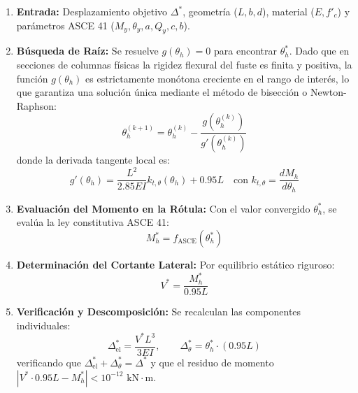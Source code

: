 \documentclass[11pt,letterpaper]{article}
\begin{document}
\begin{stepbox}
\begin{enumerate}
    \item \textbf{Entrada:} Desplazamiento objetivo $\Delta^*$, geometría ($L, b, d$), material ($E, f'_c$) y parámetros ASCE 41 ($M_y, \theta_y, a, Q_y, c, b$).
    \item \textbf{Búsqueda de Raíz:} Se resuelve $g(\theta_h) = 0$ para encontrar $\theta_h^*$. Dado que en secciones de columnas físicas la rigidez flexural del fuste es finita y positiva, la función $g(\theta_h)$ es estrictamente monótona creciente en el rango de interés, lo que garantiza una solución única mediante el método de bisección o Newton-Raphson:
    \begin{equation}
    \theta_h^{(k+1)} = \theta_h^{(k)} - \frac{g(\theta_h^{(k)})}{g'(\theta_h^{(k)})}
    \end{equation}
    donde la derivada tangente local es:
    \begin{equation}
    g'(\theta_h) = \frac{L^2}{2.85 E I} k_{t,\theta}(\theta_h) + 0.95 L \quad \text{con } k_{t,\theta} = \frac{dM_h}{d\theta_h}
    \end{equation}
    \item \textbf{Evaluación del Momento en la Rótula:} Con el valor convergido $\theta_h^*$, se evalúa la ley constitutiva ASCE 41:
    \begin{equation}
    M_h^* = f_{\text{ASCE}}(\theta_h^*)
    \end{equation}
    \item \textbf{Determinación del Cortante Lateral:} Por equilibrio estático riguroso:
    \begin{equation}
    V^* = \frac{M_h^*}{0.95 L}
    \end{equation}
    \item \textbf{Verificación y Descomposición:} Se recalculan las componentes individuales:
    \begin{equation}
    \Delta_{\text{el}}^* = \frac{V^* L^3}{3 E I}, \qquad \Delta_{\theta}^* = \theta_h^* \cdot (0.95 L)
    \end{equation}
    verificando que $\Delta_{\text{el}}^* + \Delta_{\theta}^* = \Delta^*$ y que el residuo de momento $|V^* \cdot 0.95 L - M_h^*| < 10^{-12}\text{ kN}\cdot\text{m}$.
\end{enumerate}
\end{stepbox}
\end{document}
